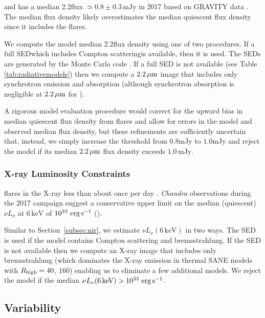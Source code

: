 \sgra and has a median 2.2\um flux $\simeq 0.8 \pm 0.3\,\mathrm{mJy}$ in 2017 based on GRAVITY data \citep[][see Table 1]{2020A&A...638A...2G}.  The median flux density likely overestimates the median quiescent flux density since it includes the flares.

We compute the model median 2.2\um flux density using one of two procedures.  If a full SED\textemdash which includes Compton scattering\textemdash is available, then it is used. The SEDs are generated by the \grmonty Monte Carlo code \citep{2009ApJS..184..387D, Wong_2022}. If a full SED is not available (see Table \ref{tab:radiativemodels}) then we compute a $2.2\,\mu\mathrm{m}$ image that includes only synchrotron emission and absorption (although synchrotron absorption is negligible at $2.2\,\mu\mathrm{m}$ for \sgra).

A rigorous model evaluation procedure would correct for the upward bias in median quiescent flux density from flares and allow for errors in the model and observed median flux density, but these refinements are sufficiently uncertain that, instead, we simply increase the threshold from $0.8$mJy to $1.0$mJy and reject the model if its
median $2.2\,\mu\mathrm{m}$ flux density exceeds $1.0\,\mathrm{mJy}$.

\subsubsection{X-ray Luminosity Constraints}

\sgra flares in the X-ray less than about once per day \citep[see][and references therein]{2018MNRAS.473..306Y}.
\emph{Chandra} observations during the 2017 campaign suggest a conservative upper limit on the median (quiescent) $\nu L_\nu$ at $6\,\mathrm{keV}$ of $10^{33}\,\,\mathrm{erg}\,\mathrm{s}^{-1}$ ().

Similar to Section~\ref{subsec:nir}, we estimate $\nu L_\nu(6\,\mathrm{keV})$ in two ways.  The SED is used if the model contains Compton scattering and bremsstrahlung.  If the SED is not available then we compute an X-ray image that includes only bremsstrahlung (which dominates the X-ray emission in thermal SANE models with $R_\mathrm{high} = 40$, $160$) enabling us to eliminate a few additional models.  We reject the model if the median $\nu L_\nu(6\,\mathrm{keV}) > 10^{33}\,\,\mathrm{erg}\,\mathrm{s}^{-1}$.


\subsection{Variability}

